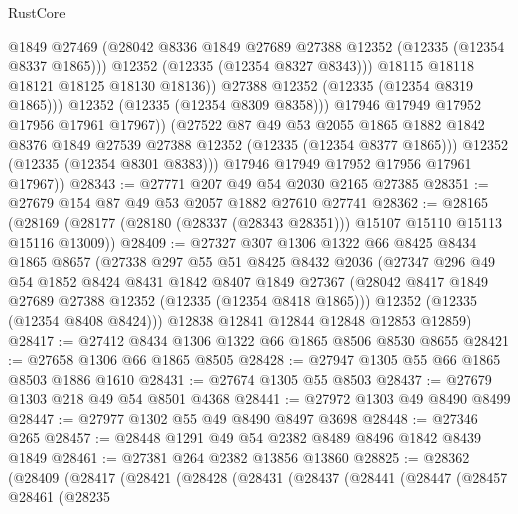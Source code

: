 \begin{lexlean}{RustCore}
\begin{coremodule}
                        @1849
                        @27469
                        (@28042 @8336 @1849 @27689 @27388 @12352 (@12335 (@12354 @8337 @1865)))
                        @12352
                        (@12335 (@12354 @8327 @8343)))
                      @18115
                      @18118
                      @18121
                      @18125
                      @18130
                      @18136))
                  @27388
                  @12352
                  (@12335 (@12354 @8319 @1865)))
                @12352
                (@12335 (@12354 @8309 @8358)))
              @17946
              @17949
              @17952
              @17956
              @17961
              @17967))
          (@27522
            @87
            @49
            @53
            @2055
            @1865
            @1882
            @1842
            @8376
            @1849
            @27539
            @27388
            @12352
            (@12335 (@12354 @8377 @1865)))
          @12352
          (@12335 (@12354 @8301 @8383)))
        @17946
        @17949
        @17952
        @17956
        @17961
        @17967))
@28343 := @27771 @207 @49 @54 @2030 @2165 @27385
@28351 := @27679 @154 @87 @49 @53 @2057 @1882 @27610 @27741
@28362 := @28165
    (@28169 (@28177 (@28180 (@28337 (@28343 @28351))) @15107 @15110 @15113 @15116 @13009))
@28409 := @27327
    @307
    @1306
    @1322
    @66
    @8425
    @8434
    @1865
    @8657
    (@27338
      @297
      @55
      @51
      @8425
      @8432
      @2036
      (@27347
        @296
        @49
        @54
        @1852
        @8424
        @8431
        @1842
        @8407
        @1849
        @27367
        (@28042 @8417 @1849 @27689 @27388 @12352 (@12335 (@12354 @8418 @1865)))
        @12352
        (@12335 (@12354 @8408 @8424)))
      @12838
      @12841
      @12844
      @12848
      @12853
      @12859)
@28417 := @27412 @8434 @1306 @1322 @66 @1865 @8506 @8530 @8655
@28421 := @27658 @1306 @66 @1865 @8505
@28428 := @27947 @1305 @55 @66 @1865 @8503 @1886 @1610
@28431 := @27674 @1305 @55 @8503
@28437 := @27679 @1303 @218 @49 @54 @8501 @4368
@28441 := @27972 @1303 @49 @8490 @8499
@28447 := @27977 @1302 @55 @49 @8490 @8497 @3698
@28448 := @27346 @265
@28457 := @28448 @1291 @49 @54 @2382 @8489 @8496 @1842 @8439 @1849
@28461 := @27381 @264 @2382 @13856 @13860
@28825 := @28362
    (@28409
      (@28417
        (@28421
          (@28428
            (@28431
              (@28437
                (@28441
                  (@28447
                    (@28457
                      @28461
                      (@28235

\end{coremodule}
\end{lexlean}
